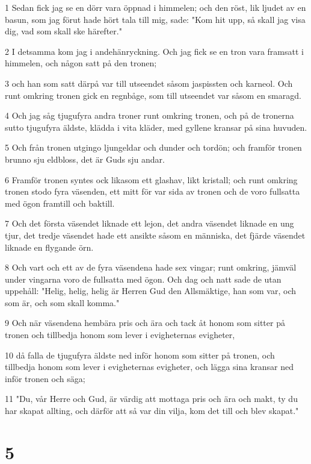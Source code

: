 \par 1 Sedan fick jag se en dörr vara öppnad i himmelen; och den röst, lik ljudet av en basun, som jag förut hade hört tala till mig, sade: "Kom hit upp, så skall jag visa dig, vad som skall ske härefter."
\par 2 I detsamma kom jag i andehänryckning. Och jag fick se en tron vara framsatt i himmelen, och någon satt på den tronen;
\par 3 och han som satt därpå var till utseendet såsom jaspissten och karneol. Och runt omkring tronen gick en regnbåge, som till utseendet var såsom en smaragd.
\par 4 Och jag såg tjugufyra andra troner runt omkring tronen, och på de tronerna sutto tjugufyra äldste, klädda i vita kläder, med gyllene kransar på sina huvuden.
\par 5 Och från tronen utgingo ljungeldar och dunder och tordön; och framför tronen brunno sju eldbloss, det är Guds sju andar.
\par 6 Framför tronen syntes ock likasom ett glashav, likt kristall; och runt omkring tronen stodo fyra väsenden, ett mitt för var sida av tronen och de voro fullsatta med ögon framtill och baktill.
\par 7 Och det första väsendet liknade ett lejon, det andra väsendet liknade en ung tjur, det tredje väsendet hade ett ansikte såsom en människa, det fjärde väsendet liknade en flygande örn.
\par 8 Och vart och ett av de fyra väsendena hade sex vingar; runt omkring, jämväl under vingarna voro de fullsatta med ögon. Och dag och natt sade de utan uppehåll: "Helig, helig, helig är Herren Gud den Allsmäktige, han som var, och som är, och som skall komma."
\par 9 Och när väsendena hembära pris och ära och tack åt honom som sitter på tronen och tillbedja honom som lever i evigheternas evigheter,
\par 10 då falla de tjugufyra äldste ned inför honom som sitter på tronen, och tillbedja honom som lever i evigheternas evigheter, och lägga sina kransar ned inför tronen och säga;
\par 11 "Du, vår Herre och Gud, är värdig att mottaga pris och ära och makt, ty du har skapat allting, och därför att så var din vilja, kom det till och blev skapat."

\chapter{5}

